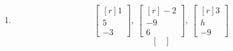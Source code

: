 \documentclass[12pt]{article}
\begin{document}
\begin{multicols*}{2}
\begin{enumerate}
		\begin{enumerate}
			\item \[
				\begin{bmatrix*}[r]
					1\\5\\-3
				\end{bmatrix*},\ \begin{bmatrix*}[r]
					-2\\-9\\6
				\end{bmatrix*},\ \begin{bmatrix*}[r]
					3\\h\\-9
				\end{bmatrix*}
			\]
			\vfill
			\[
				\begin{bmatrix*}
					
				\end{bmatrix*}
			\]
		\end{enumerate}
	\end{enumerate}	
\end{multicols*}
\end{document}
